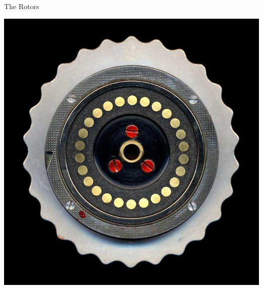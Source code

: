 \documentclass[hyphens,aspectratio=169]{beamer}
\begin{document}
\begin{frame}[fragile]{The Rotors}
\begin{center}
{\begin{minipage}{0.48\textwidth}
        \vspace{4mm} %
        \includegraphics[width=0.8\linewidth]{paper/images/exit.jpg}
    \end{minipage}
    }
\end{center}
\end{frame}
\end{document}
